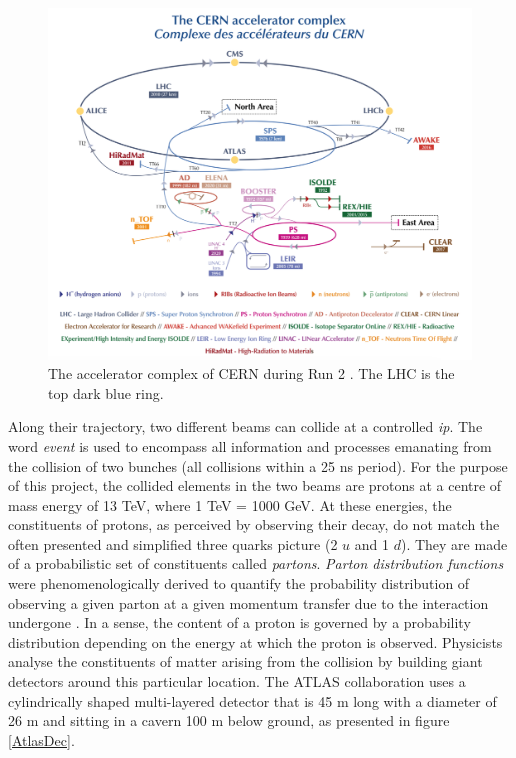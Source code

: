 \begin{figure}[!h]
\centering
\hspace*{-0.5in}
\includegraphics[scale = 0.4]{Images/ATLAS/cernAcc}
\caption{The accelerator complex of CERN during Run 2 \cite{CERNAcc}. The LHC is the top dark blue ring.}
\label{fig-CernAccSys}
\end{figure}
\newpage
Along their trajectory, two different beams can collide at a controlled \textit{\gls{ip}}. The word \textit{event} is used to encompass all information and processes emanating from the collision of two bunches (all collisions within a 25 ns period). For the purpose of this project, the collided elements in the two beams are protons at a centre of mass energy of 13 TeV, where 1 TeV = 1000 GeV. At these energies, the constituents of protons, as perceived by observing their decay, do not match the often presented and simplified three quarks picture (2 $u$ and 1 $d$). They are made of a probabilistic set of constituents called \textit{partons}. \textit{Parton distribution functions} were phenomenologically derived to quantify the probability distribution of observing a given parton at a given momentum transfer due to the interaction undergone \cite{pdfLHC}. In a sense, the content of a proton is governed by a probability distribution depending on the energy at which the proton is observed. Physicists analyse the constituents of matter arising from the collision by building giant detectors around this particular location. The ATLAS collaboration uses a cylindrically shaped multi-layered detector that is 45 m long with a diameter of 26 m and sitting in a cavern 100 m below ground, as presented in figure \ref{AtlasDec}.

